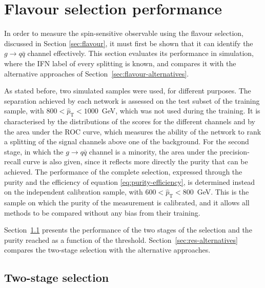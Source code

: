 \section{Flavour selection performance}
\label{sec:res-performance}

In order to measure the spin-sensitive observable using the flavour selection, discussed
in Section \ref{sec:flavour}, it must first be shown that it can identify the $g \to q\bar{q}$ channel
effectively. This section evaluates its performance in simulation, where the IFN
label of every splitting is known, and compares it with the alternative approaches
of Section~\ref{sec:flavour-alternatives}.

As stated before, two simulated samples were used, for different purposes. 
The separation achieved by
each network is assessed on the test subset of the training sample, with
$800 < \hat{p}_{\mathrm{T}} < 1000$~GeV, which was not used during the training.
It is characterised by the distributions of the scores for the different channels
and by the area under the ROC curve, which measures the ability of the network to
rank a splitting of the signal channels above one of the background. For the second
stage, in which the $g \to q\bar{q}$ channel is a minority, the area under the
precision-recall curve is also given, since it reflects more directly the purity
that can be achieved. The performance of the complete selection, expressed through
the purity and the efficiency of equation \eqref{eq:purity-efficiency}, is determined
instead on the independent calibration sample, with
$600 < \hat{p}_{\mathrm{T}} < 800$~GeV. This is the sample on which the purity of
the measurement is calibrated, and it allows all methods to be compared without
any bias from their training.

Section~\ref{sec:res-twostage} presents the performance of the two stages of the
selection and the purity reached as a function of the threshold.
Section~\ref{sec:res-alternatives} compares the two-stage selection with the
alternative approaches.

\subsection{Two-stage selection}
\label{sec:res-twostage}

